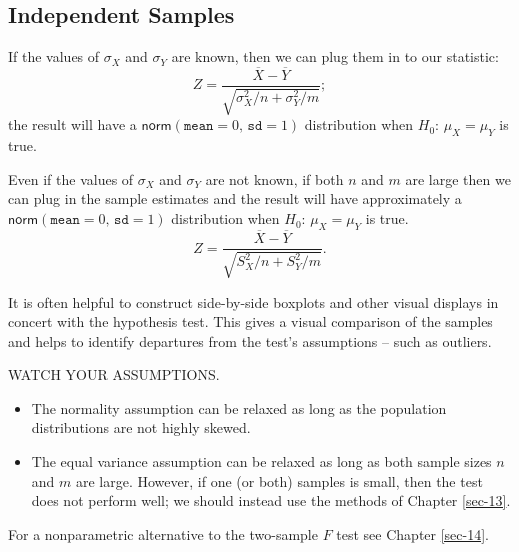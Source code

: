 \subsection{Independent Samples}
\label{sec-10-4-1}

\begin{rem}
If the values of \(\sigma_{X}\) and \(\sigma_{Y}\) are known, then we
can plug them in to our statistic:
\begin{equation} 
Z = \frac{\overline{X} - \overline{Y}}{\sqrt{\sigma_{X}^{2}/n + \sigma_{Y}^{2}/m}};
\end{equation}
the result will have a \(\mathsf{norm}(\mathtt{mean} = 0,\,\mathtt{sd}
= 1)\) distribution when \(H_{0}:\,\mu_{X} = \mu_{Y}\) is true.
\end{rem}

\begin{rem}
Even if the values of \(\sigma_{X}\) and \(\sigma_{Y}\) are not known,
if both \(n\) and \(m\) are large then we can plug in the sample
estimates and the result will have approximately a
\(\mathsf{norm}(\mathtt{mean} = 0,\,\mathtt{sd} = 1)\) distribution when
\(H_{0}:\,\mu_{X} = \mu_{Y}\) is true.
\begin{equation} 
Z = \frac{\overline{X} - \overline{Y}}{\sqrt{S_{X}^{2}/n + S_{Y}^{2}/m}}.
\end{equation}
\end{rem}

\begin{rem}
It is often helpful to construct side-by-side boxplots and other
visual displays in concert with the hypothesis test. This gives a
visual comparison of the samples and helps to identify departures from
the test's assumptions -- such as outliers.
\end{rem}

\begin{rem}
WATCH YOUR ASSUMPTIONS.
\begin{itemize}
\item The normality assumption can be relaxed as long as the population
distributions are not highly skewed.
\item The equal variance assumption can be relaxed as long as both sample
sizes \(n\) and \(m\) are large. However, if one (or both) samples
is small, then the test does not perform well; we should instead use
the methods of Chapter \ref{sec-13}.
\end{itemize}
\end{rem}

For a nonparametric alternative to the two-sample \(F\) test see
Chapter \ref{sec-14}.

